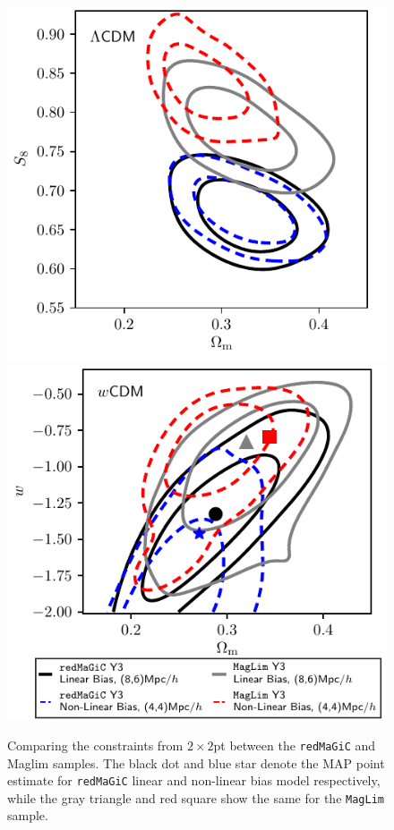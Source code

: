 \documentclass[aps, prd,twocolumn,superscriptaddress,nofootinbib,preprintnumbers]{revtex4-1}
\newcommand{\redmagic}{\texttt{redMaGiC} }
\newcommand{\maglim}{\texttt{MagLim} }
\newcommand{\SP}[1]{{\color{orange}[SP: #1]}}
\newcommand{\gary}[1]{\textcolor{red}{#1}}
\begin{document}
\begin{figure}
\includegraphics[width=\columnwidth]{figs/compare_maglim_rm_lcdm.pdf}
\includegraphics[width=\columnwidth]{figs/compare_maglim_rm_wcdm.pdf}
\caption[]{Comparing the constraints from $2\times2$pt between the \redmagic and Maglim samples. The black dot and blue star denote the MAP point estimate for \redmagic linear and non-linear bias model respectively, while the gray triangle and red square show the same for the \maglim sample. 
}\label{fig:maglim_comp}
\end{figure}
\end{document}
